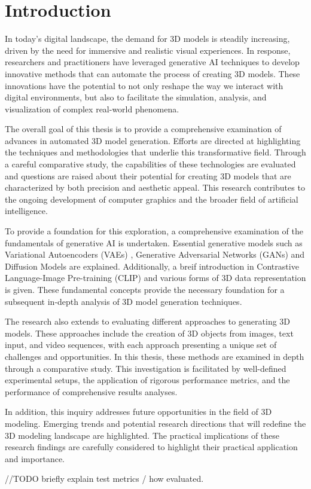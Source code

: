 \chapter{Introduction}
\label{ch:introduction}

In today's digital landscape, the demand for 3D models is steadily increasing, driven by the need for immersive and realistic visual experiences. In response, researchers and practitioners have leveraged generative AI techniques to develop innovative methods that can automate the process of creating 3D models. These innovations have the potential to not only reshape the way we interact with digital environments, but also to facilitate the simulation, analysis, and visualization of complex real-world phenomena.

The overall goal of this thesis is to provide a comprehensive examination of advances in automated 3D model generation. Efforts are directed at highlighting the techniques and methodologies that underlie this transformative field. Through a careful comparative study, the capabilities of these technologies are evaluated and questions are raised about their potential for creating 3D models that are characterized by both precision and aesthetic appeal. This research contributes to the ongoing development of computer graphics and the broader field of artificial intelligence.

To provide a foundation for this exploration, a comprehensive examination of the fundamentals of generative AI is undertaken.  Essential generative models such as Variational Autoencoders (VAEs) \citep{kingmaVAE,rezendeVAE}, Generative Adversarial Networks (GANs) \citep{goodfellowGAN} and Diffusion Models \citep{yangdiffusionSummary,hoDDPMs, sohlDDPM} are explained. Additionally, a breif introduction in Contrastive Language-Image Pre-training (CLIP) \citep{radfordCLIP} and various forms of 3D data representation is given. These fundamental concepts provide the necessary foundation for a subsequent in-depth analysis of 3D model generation techniques.

The research also extends to evaluating different approaches to generating 3D models. These approaches include the creation of 3D objects from images, text input, and video sequences, with each approach presenting a unique set of challenges and opportunities. In this thesis, these methods are examined in depth through a comparative study. This investigation is facilitated by well-defined experimental setups, the application of rigorous performance metrics, and the performance of comprehensive results analyses.

In addition, this inquiry addresses future opportunities in the field of 3D modeling. Emerging trends and potential research directions that will redefine the 3D modeling landscape are highlighted. The practical implications of these research findings are carefully considered to highlight their practical application and importance.

//TODO briefly explain test metrics / how evaluated.